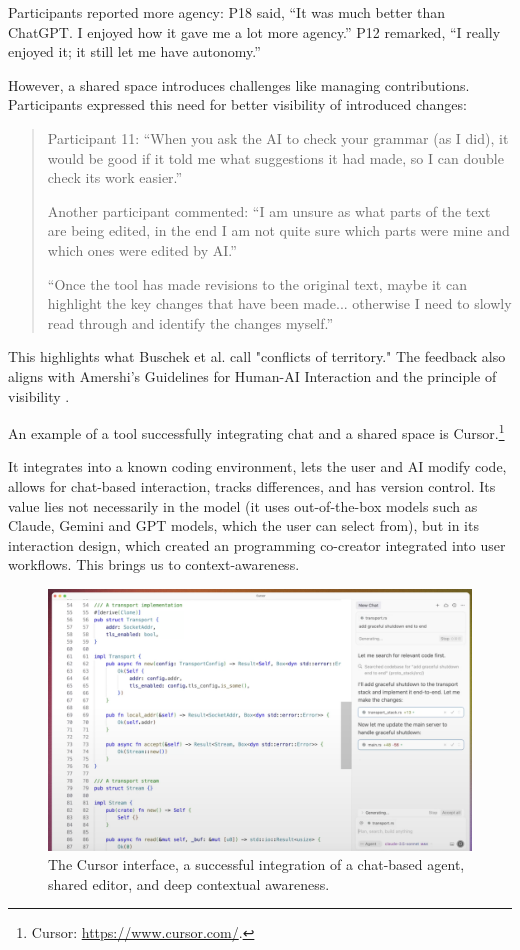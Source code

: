 Participants reported more agency: P18 said, “It was much better than ChatGPT. I enjoyed how it gave me a lot more agency.” P12 remarked, “I really enjoyed it; it still let me have autonomy.” 

However, a shared space introduces challenges like managing contributions. Participants expressed this need for better visibility of introduced changes:
\begin{quote}
Participant 11: “When you ask the AI to check your grammar (as I did), it would be good if it told me what suggestions it had made, so I can double check its work easier.”

Another participant commented: “I am unsure as what parts of the text are being edited, in the end I am not quite sure which parts were mine and which ones were edited by AI.”

“Once the tool has made revisions to the original text, maybe it can highlight the key changes that have been made... otherwise I need to slowly read through and identify the changes myself.”
\end{quote}

This highlights what Buschek et al. \cite{Buschek2021-ks} call "conflicts of territory." The feedback also aligns with Amershi's Guidelines for Human-AI Interaction \cite{Amershi2019-wu} and the principle of visibility \cite{Nielsen1994-df}.

An example of a tool successfully integrating chat and a shared space is Cursor.\footnote{Cursor: \href{https://www.cursor.com/}{https://www.cursor.com/}.}

 It integrates into a known coding environment, lets the user and AI modify code, allows for chat-based interaction, tracks differences, and has version control. Its value lies not necessarily in the model (it uses out-of-the-box models such as Claude, Gemini and GPT models, which the user can select from), but in its interaction design, which created an programming co-creator integrated into user workflows. This brings us to context-awareness.
\begin{figure}[H]
    \centering
    \includegraphics[width=1\linewidth]{cursor.png}
    \caption{The Cursor interface, a successful integration of a chat-based agent, shared editor, and deep contextual awareness.}
    \label{fig:cursor}
\end{figure}


